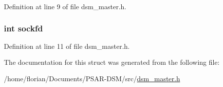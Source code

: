 Definition at line 9 of file dsm\+\_\+master.\+h.

\subsubsection[{\texorpdfstring{sockfd}{sockfd}}]{\setlength{\rightskip}{0pt plus 5cm}int sockfd}\hypertarget{structdsm__master__s_ad2c8fb3df3a737e0685e902870a611d2}{}\label{structdsm__master__s_ad2c8fb3df3a737e0685e902870a611d2}


Definition at line 11 of file dsm\+\_\+master.\+h.



The documentation for this struct was generated from the following file\+:\begin{DoxyCompactItemize}
\item 
/home/florian/\+Documents/\+P\+S\+A\+R-\/\+D\+S\+M/src/\hyperlink{dsm__master_8h}{dsm\+\_\+master.\+h}\end{DoxyCompactItemize}
